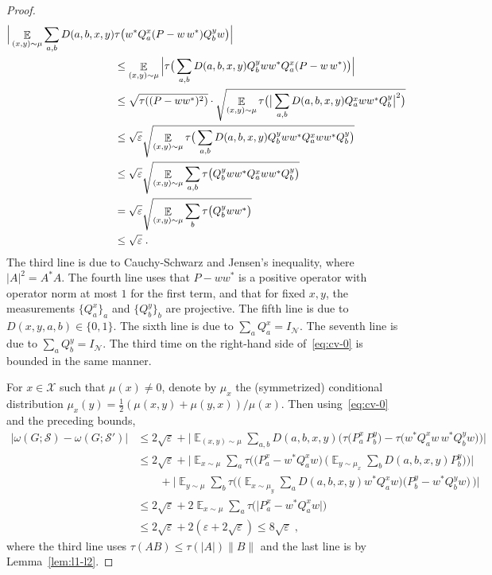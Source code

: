 \documentclass[11pt]{article}
\theoremstyle{definition}
\newcommand{\strategy}{\mathscr{S}}
\DeclareMathOperator*{\Expectation}{\mathbb{E}}
\newcommand{\Es}[1]{\Expectation_{#1}}
\newcommand{\mX}{\ensuremath{\mathcal{X}}}
\newcommand{\eps}{\varepsilon}
\newcommand{\mN}{\mathcal{N}}
\begin{document}
\begin{proof}
\begin{align}
\Big|\Es{(x,y)\sim\mu} \sum_{a,b} D(a,b,x,y) & \tau\big( w^* Q^x_a (P - w\, w^* ) Q^y_b w\big)\Big|\notag\\
&\leq \Es{(x,y)\sim\mu} \Big | \tau\big( \sum_{a,b} D(a,b,x,y)   Q^y_b w w^* Q^x_a (P - w\, w^* ) \big) \Big | \notag\\
&\leq \sqrt{ \tau((P - ww^*)^2)} \cdot \sqrt{\Es{(x,y)\sim\mu} \tau\big( \big| \sum_{a,b} D(a,b,x,y)   Q^x_a w w^* Q^y_b \big|^2 \big) } \notag\\
&\leq \sqrt{\eps}\sqrt{ \Es{(x,y)\sim\mu} \tau\big( \sum_{a,b} D(a,b,x,y)   Q^y_b ww^* Q^x_a w w^* Q^y_b \big) } \notag\\
&\leq \sqrt{\eps}\sqrt{ \Es{(x,y)\sim\mu}  \sum_{a,b}  \tau\big(Q^y_b ww^* Q^x_a w w^* Q^y_b \big) } \notag \\
&=\sqrt{\eps}\sqrt{ \Es{(x,y)\sim\mu}  \sum_{b}  \tau\big(Q^y_b ww^* \big) } \notag\\
&\leq \sqrt{\eps}\;.\label{eq:cv-1}
\end{align}
The third line is due to Cauchy-Schwarz and Jensen's inequality, where $|A|^2=A^*A$. The fourth line uses that $P - ww^*$ is a positive operator with operator norm at most $1$ for the first term, and that for fixed $x,y$, the measurements $\{ Q^x_a \}_a$ and $\{Q^y_b\}_b$ are projective. The fifth line is due to $D(x,y,a,b) \in \{0,1\}$. The sixth line is due to $\sum_a Q^x_a = I_\mN$. The seventh line is due to $\sum_a Q^y_b = I_\mN$. The third time on the right-hand side of~\eqref{eq:cv-0} is bounded in the same manner. 

For $x\in \mX$ such that $\mu(x)\neq 0$, denote by $\mu_x$ the (symmetrized) conditional distribution $\mu_x(y)=\frac{1}{2}(\mu(x,y)+\mu(y,x))/\mu(x)$. Then using~\eqref{eq:cv-0} and the preceding bounds,
\begin{align*}
\big|\omega(G;\strategy) - \omega(G;\strategy')\big|
 &\leq 2\sqrt{\eps}+ \Big|\Es{(x,y)\sim\mu} \sum_{a,b} D(a,b,x,y) \big( \tau\big( P^x_a \, P^y_b \big)-\tau\big( w^* Q^x_a w\, w^* Q^y_b w\big)\big)\Big|\\
&\leq  2\sqrt{\eps}+ \Big|\Es{x\sim\mu} \sum_{a}  \tau\Big( \big(P^x_a-w^* Q^x_aw\big) \, \Big( \Es{y\sim \mu_x} \sum_b D(a,b,x,y) P^y_b \Big)\Big)\Big|\\
&\qquad+ \Big|\Es{y\sim\mu} \sum_{b}  \tau\Big(\Big( \Es{x\sim \mu_y} \sum_a D(a,b,x,y) w^* Q^x_a w\Big) \big(P^y_b-w^*Q^y_bw\big) \, \Big)\Big|\\
&\leq 2\sqrt{\eps}+2\Es{x\sim\mu} \sum_{a}  \tau\big(\big| P^x_a-w^*Q^x_aw\big|\big) \\
&\leq 2\sqrt{\eps}+2(\eps + 2\sqrt{\eps}) \leq 8\sqrt{\eps}\;,
\end{align*}
where the third line uses $\tau(AB)\leq\tau(|A|)\|B\|$ and the last line is by Lemma~\ref{lem:l1-l2}.%
\end{proof}
	
\end{document}
